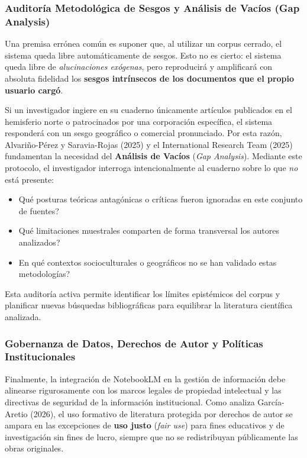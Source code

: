 \subsubsection{Auditoría Metodológica de Sesgos y Análisis de Vacíos (Gap Analysis)}

Una premisa errónea común es suponer que, al utilizar un corpus cerrado, el sistema queda libre automáticamente de sesgos. Esto no es cierto: el sistema queda libre de \textit{alucinaciones exógenas}, pero reproducirá y amplificará con absoluta fidelidad los \textbf{sesgos intrínsecos de los documentos que el propio usuario cargó}.

Si un investigador ingiere en su cuaderno únicamente artículos publicados en el hemisferio norte o patrocinados por una corporación específica, el sistema responderá con un sesgo geográfico o comercial pronunciado. Por esta razón, Alvariño-Pérez y Saravia-Rojas (2025) y el International Research Team (2025) fundamentan la necesidad del \textbf{Análisis de Vacíos} (\textit{Gap Analysis}). Mediante este protocolo, el investigador interroga intencionalmente al cuaderno sobre lo que \textit{no} está presente:
\begin{itemize}
    \item \textquestiondown Qué posturas teóricas antagónicas o críticas fueron ignoradas en este conjunto de fuentes?
    \item \textquestiondown Qué limitaciones muestrales comparten de forma transversal los autores analizados?
    \item \textquestiondown En qué contextos socioculturales o geográficos no se han validado estas metodologías?
\end{itemize}

Esta auditoría activa permite identificar los límites epistémicos del corpus y planificar nuevas búsquedas bibliográficas para equilibrar la literatura científica analizada.

\subsubsection{Gobernanza de Datos, Derechos de Autor y Políticas Institucionales}

Finalmente, la integración de NotebookLM en la gestión de información debe alinearse rigurosamente con los marcos legales de propiedad intelectual y las directivas de seguridad de la información institucional. Como analiza García-Aretio (2026), el uso formativo de literatura protegida por derechos de autor se ampara en las excepciones de \textbf{uso justo} (\textit{fair use}) para fines educativos y de investigación sin fines de lucro, siempre que no se redistribuyan públicamente las obras originales.

